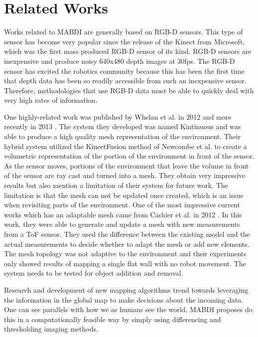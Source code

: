 \section{Related Works}	\label{sec:related_works}


Works related to MABDI are generally based on RGB-D sensors. This type of sensor has
become very popular since the release of the Kinect from Microsoft, which
was the first mass produced RGB-D sensor of its kind. RGB-D sensors are
inexpensive and produce noisy 640x480 depth images at 30fps. The RGB-D
sensor has excited the robotics community because this has been the first
time that depth data has been so readily accessible from such an
inexpensive sensor. Therefore, methodologies that use RGB-D data must be able to quickly
deal with very high rates of information.

One highly-related work was published by Whelan
et al. in 2012 \cite{Whelan2012} and more recently in 2013
\cite{Whelan12tr}. The system they developed was named Kintinuous and was
able to produce a high quality mesh representation of the environment.
Their hybrid system utilized the KinectFusion method
\cite{Newcombe2011a} of Newcombe et al. to create a volumetric
representation of the portion of the environment in front of the sensor. As
the sensor moves, portions of the environment that leave the volume in
front of the sensor are ray cast and turned into a mesh. They obtain very
impressive results but also mention a limitation of their system for future
work. The limitation is that the mesh can not be updated once created,
which is an issue when revisiting parts of the environment. One of the most
impressive current works which has an adaptable mesh came from Cashier et
al. in 2012 \cite{Cahier2012}. In this work, they were able to generate and
update a mesh with new measurements from a ToF sensor. They used the
difference between the existing model and the actual measurements to decide
whether to adapt the mesh or add new elements. The mesh topology was not
adaptive to the environment and their experiments only showed results of mapping a
single flat wall with no robot movement. The system needs to be tested for
object addition and removal.

Research and development of new mapping algorithms trend towards
leveraging the information in the global map to make decisions about the
incoming data. One can see parallels with how we as humans see the world. MABDI
proposes do this in a computationally feasible way by simply using
differencing and thresholding imaging methods.








